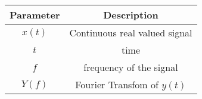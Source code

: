 \renewcommand{\arraystretch}{1.5}
\begin{tabular}{|c|c|}
\hline
Parameter & Description  \\\hline
$x(t)$ & Continuous real valued signal  \\\hline
$t$ & time \\\hline
$f$ & frequency of the signal \\\hline
$Y(f)$& Fourier Transfom of $y(t)$\\\hline
\end{tabular}
